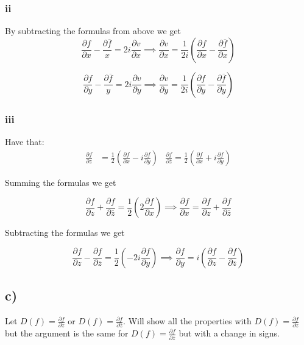 \documentclass{article}
\begin{document}
  \subsubsection*{ii}
  By subtracting the formulas from above we get
  \[
  \frac{\partial f}{\partial x} - \frac{\partial  \overline{f}}{x}= 2i\frac{\partial v}{\partial x} \implies \frac{\partial v}{\partial x} = \frac{1}{2i}\left(\frac{\partial f}{\partial x} - \frac{\partial \overline{f}}{\partial x}\right)
  \]

  \[
  \frac{\partial f}{\partial y} - \frac{\partial  \overline{f}}{y}= 2i\frac{\partial v}{\partial y} \implies \frac{\partial v}{\partial y} = \frac{1}{2i}\left(\frac{\partial f}{\partial y} - \frac{\partial \overline{f}}{\partial y}\right)
  \]


  \subsubsection*{iii}
  Have that:
  \begin{align*}
    \frac{\partial f}{\partial z} &= \frac{1}{2}\left(\frac{\partial f}{\partial x} - i\frac{\partial f}{\partial y}\right)
    &\frac{\partial f}{\partial \overline{z}} = \frac{1}{2}\left(\frac{\partial f}{\partial x} + i\frac{\partial f}{\partial y}\right)
  \end{align*}

  Summing the formulas we get

  \[\frac{\partial f}{\partial z} + \frac{\partial f}{\partial \overline{z}} = \frac{1}{2}\left(2\frac{\partial f}{\partial x}\right) \implies \frac{\partial f}{\partial x} = \frac{\partial f}{\partial z} + \frac{\partial f}{\partial \overline{z}}\]

  Subtracting the formulas we get

  \[\frac{\partial f}{\partial z} - \frac{\partial f}{\partial \overline{z}} = \frac{1}{2}\left(-2i\frac{\partial f}{\partial y}\right) \implies \frac{\partial f}{\partial y} = i\left(\frac{\partial f}{\partial z} - \frac{\partial f}{\partial \overline{z}}\right)\]


  \subsection*{c)}

  Let $D(f)= \frac{\partial f}{\partial z}$ or $D(f)= \frac{\partial f}{\partial \overline{z}}$. Will show all the properties with $D(f) = \frac{\partial f}{\partial z}$ but the argument is the same for $D(f)= \frac{\partial f}{\partial \overline{z}}$ but with a change in signs.
\end{document}
